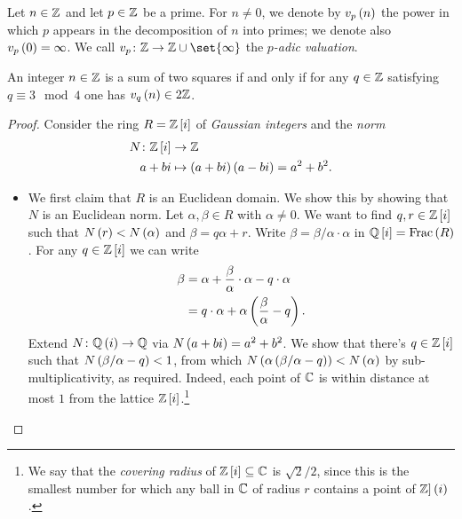 \documentclass[11pt]{karticle}
\begin{document}
\begin{definition}
Let $n \in \mathbb{Z}$ and let $p \in \mathbb{Z}$ be a prime. For $n \neq 0$, we denote by $v_p\left( n \right)$ the power in which $p$ appears in the decomposition of $n$ into primes; we denote also $v_p\left( 0 \right) = \infty$.
We call $v_p \colon \mbb{Z} \to \mbb{Z} \cup \set{\infty}$ the \emph{$p$-adic valuation}.
\end{definition}

\begin{theorem}[Fermat]
An integer $n \in \mathbb{Z}$ is a sum of two squares if and only if for any $q \in \mathbb{Z}$ satisfying $q \equiv 3 \mod{4}$ one has $v_q\left( n \right) \in 2 \mathbb{Z}$.
\end{theorem}

\begin{proof}
Consider the ring $R = \mathbb{Z}\left[ i \right]$ of \emph{Gaussian integers} and the \emph{norm}
\begin{align*}
N \colon \mathbb{Z}\left[ i \right] &\to \mathbb{Z} \\
a + bi &\mapsto \left( a+bi \right)\left( a-bi \right) = a^2 + b^2 \text{.}
\end{align*}

\begin{itemize}
\item

We first claim that $R$ is an Euclidean domain. We show this by showing that $N$ is an Euclidean norm.
Let $\alpha,\beta \in R$ with $\alpha \neq 0$. We want to find $q,r \in \mathbb{Z}\left[ i \right]$ such that $N\left( r \right) < N\left( \alpha \right)$ and $\beta = q \alpha + r$.
Write $\beta = \beta / \alpha \cdot \alpha$ in $\mathbb{Q}\left[ i \right] = \mathrm{Frac}\left( R \right)$. For any $q \in \mathbb{Z}\left[ i \right]$ we can write
\begin{align*}
\beta &= \alpha + \frac{\beta}{\alpha} \cdot \alpha - q \cdot \alpha \\&= q \cdot \alpha + \alpha\left( \frac{\beta}{\alpha} - q \right) \text{.}
\end{align*}
Extend $N \colon \mathbb{Q}\left( i \right) \to \mathbb{Q}$ via $N\left( a + bi \right) = a^2 + b^2$.
We show that there's $q \in \mathbb{Z}\left[ i \right]$ such that $N\left( \beta / \alpha - q \right) < 1$, from which $N\left( \alpha\left( \beta / \alpha - q \right) \right) < N\left( \alpha \right)$ by sub-multiplicativity, as required.
Indeed, each point of $\mathbb{C}$ is within distance at most $1$ from the lattice $\mathbb{Z}\left[ i \right]$.\footnote{We say that the \emph{covering radius} of $\mathbb{Z}\left[ i \right] \subseteq \mathbb{C}$ is $\sqrt{2}/2$, since this is the smallest number for which any ball in $\mathbb{C}$ of radius $r$ contains a point of $\mathbb{Z}]\left( i \right)$.}


\end{itemize}
\end{proof}
\end{document}
